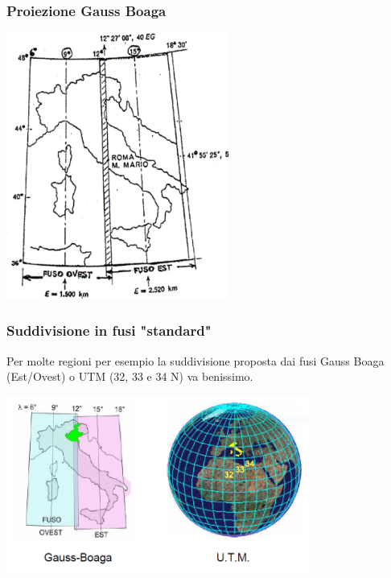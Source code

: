 \documentclass{beamer}
\begin{document}
{\begin{frame}
   \frametitle{Proiezione Gauss Boaga}
	\begin{center}
		\includegraphics[width=0.55\textwidth] {./pics/GB.png}
	\end{center}
\end{frame}

\begin{frame}
\frametitle{Suddivisione in fusi "standard"}
Per molte regioni per esempio la suddivisione proposta dai fusi Gauss Boaga (Est/Ovest) o UTM (32, 33 e 34 N) va benissimo.
\begin{center}
	\includegraphics[width=0.75\textwidth] {./pics/proiezioni0.PNG}
\end{center}
\end{frame}

}
\end{document}
